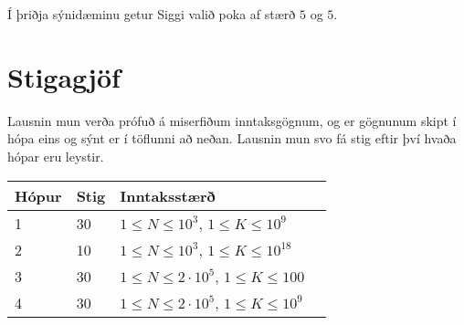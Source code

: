 Í þriðja sýnidæminu getur Siggi valið poka af stærð $5$ og $5$.

\section*{Stigagjöf}
Lausnin mun verða prófuð á miserfiðum inntaksgögnum, og er gögnunum skipt í
hópa eins og sýnt er í töflunni að neðan. Lausnin mun svo fá stig eftir því
hvaða hópar eru leystir.

\begin{tabular}{|l|l|l|l|}
\hline
Hópur & Stig & Inntaksstærð \\ \hline
	1     & 30         & $ 1 \le N \le 10^3$,  $ 1 \le K \le 10^9$\\ \hline
	2     & 10         & $ 1 \le N \le 10^3$,  $ 1 \le K \le 10^{18}$\\ \hline
	3     & 30         & $ 1 \le N \le 2\cdot 10^5$,  $ 1 \le K \le 100$\\ \hline
	4     & 30         & $ 1 \le N \le 2\cdot 10^5$,  $ 1 \le K \le 10^{9}$\\ \hline
\end{tabular}
